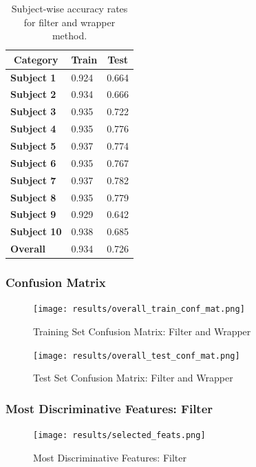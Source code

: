 \documentclass[12pt,twoside,a4paper]{article}
\begin{document}
\begin{table}[H]
\centering
\begin{tabular}{|l|l|l|}
\hline
\multicolumn{1}{|c|}{\textbf{Category}} & \multicolumn{1}{c|}{\textbf{Train}} & \multicolumn{1}{c|}{\textbf{Test}} \\ \hline
\textbf{Subject 1}  & 0.924 & 0.664 \\ \hline
\textbf{Subject 2}  & 0.934 & 0.666 \\ \hline
\textbf{Subject 3}  & 0.935 & 0.722 \\ \hline
\textbf{Subject 4}  & 0.935 & 0.776 \\ \hline
\textbf{Subject 5}  & 0.937 & 0.774 \\ \hline
\textbf{Subject 6}  & 0.935 & 0.767 \\ \hline
\textbf{Subject 7}  & 0.937 & 0.782 \\ \hline
\textbf{Subject 8}  & 0.935 & 0.779 \\ \hline
\textbf{Subject 9}  & 0.929 & 0.642 \\ \hline
\textbf{Subject 10} & 0.938 & 0.685 \\ \hline
\textbf{Overall}    & 0.934 & 0.726 \\ \hline
\end{tabular}
\caption{Subject-wise accuracy rates for filter and wrapper method.}
\label{tab:FNWT}
\end{table}

\subsubsection*{Confusion Matrix}

\begin{figure}[H]
    \centering
    \texttt{[image: results/overall\_train\_conf\_mat.png]}
    \caption{Training Set Confusion Matrix: Filter and Wrapper}
    \label{fig: FW4}
\end{figure}

\begin{figure}[H]
    \centering
    \texttt{[image: results/overall\_test\_conf\_mat.png]}
    \caption{Test Set Confusion Matrix: Filter and Wrapper}
    \label{fig: FW5}
\end{figure}

\subsubsection*{Most Discriminative Features: Filter}

\begin{figure}[H]
    \centering
    \texttt{[image: results/selected\_feats.png]}
    \caption{Most Discriminative Features: Filter}
    \label{fig: FW6}
\end{figure}
\end{document}
